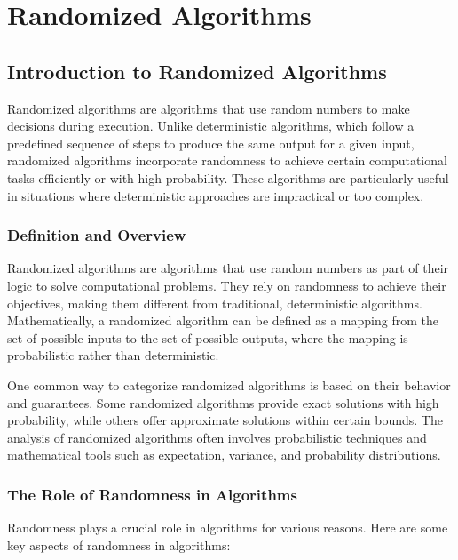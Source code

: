 \documentclass[12pt]{book} %
\begin{document}
\chapter{Randomized Algorithms}

\section{Introduction to Randomized Algorithms}
Randomized algorithms are algorithms that use random numbers to make decisions during execution. Unlike deterministic algorithms, which follow a predefined sequence of steps to produce the same output for a given input, randomized algorithms incorporate randomness to achieve certain computational tasks efficiently or with high probability. These algorithms are particularly useful in situations where deterministic approaches are impractical or too complex.

\subsection{Definition and Overview}
Randomized algorithms are algorithms that use random numbers as part of their logic to solve computational problems. They rely on randomness to achieve their objectives, making them different from traditional, deterministic algorithms. Mathematically, a randomized algorithm can be defined as a mapping from the set of possible inputs to the set of possible outputs, where the mapping is probabilistic rather than deterministic.

One common way to categorize randomized algorithms is based on their behavior and guarantees. Some randomized algorithms provide exact solutions with high probability, while others offer approximate solutions within certain bounds. The analysis of randomized algorithms often involves probabilistic techniques and mathematical tools such as expectation, variance, and probability distributions.

\subsection{The Role of Randomness in Algorithms}
Randomness plays a crucial role in algorithms for various reasons. Here are some key aspects of randomness in algorithms:
\end{document}
